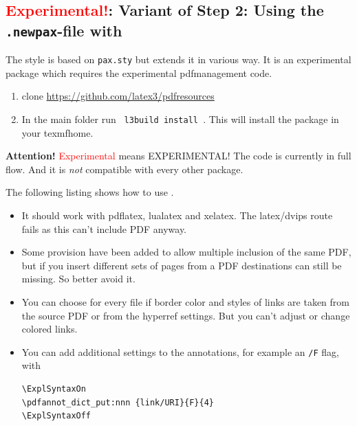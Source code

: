 \documentclass[DIV=12,parskip=half-,bibliography=totoc]{scrartcl}
\begin{document}


\subsection[Alternative Step 2: Using the \texttt{.newpax}-file with \pkg{newpax.sty}]
{\textcolor{red}{Experimental!}: Variant of Step 2: Using the \texttt{.newpax}-file with }


The style  is based on \texttt{pax.sty} but extends it in various way. It is an experimental package which requires the experimental pdfmanagement code.

\begin{enumerate}
\item clone \url{https://github.com/latex3/pdfresources}
\item In the main folder run \lstinline+ l3build install +. This will install the package in your texmfhome.
\end{enumerate}


\textbf{Attention!} \textcolor{red}{Experimental} means EXPERIMENTAL! The code is currently in full flow. And it is \emph{not} compatible with every other package.

The following listing shows how to use .

\begin{itemize}
\item It should work with pdflatex, lualatex and xelatex. The latex/dvips route fails as this can't include PDF anyway.
\item Some provision have been added to allow multiple inclusion of the same PDF, but if you insert different sets of pages from a PDF destinations can still be missing. So better avoid it.
\item You can choose for every file if border color and styles of links are taken from the source PDF or from the hyperref settings. But you can't adjust or change colored links.
\item You can add additional settings to the annotations, for example an \texttt{/F} flag, with 

\begin{lstlisting}
\ExplSyntaxOn
\pdfannot_dict_put:nnn {link/URI}{F}{4}
\ExplSyntaxOff
\end{lstlisting}
    
\end{itemize}



\end{document}
